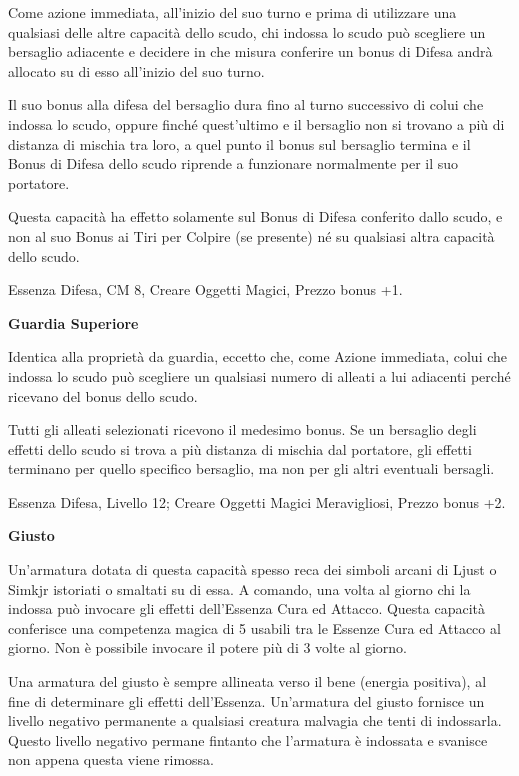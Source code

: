 \documentclass[a4paper,11pt,twoside,openany]{book}
\begin{document}
Come azione immediata, all'inizio del suo turno e prima di utilizzare una qualsiasi delle altre capacità dello scudo, chi indossa lo scudo può scegliere un bersaglio adiacente e decidere in che misura conferire un bonus di Difesa andrà allocato su di esso all'inizio del suo turno.

Il suo bonus alla difesa del bersaglio dura fino al turno successivo di colui che indossa lo scudo, oppure finché quest'ultimo e il bersaglio non si trovano a più di distanza di mischia tra loro, a quel punto il bonus sul bersaglio termina e il Bonus di Difesa dello scudo riprende a funzionare normalmente per il suo portatore.

Questa capacità ha effetto solamente sul Bonus di Difesa conferito dallo scudo, e non al suo Bonus ai Tiri per Colpire (se presente) né su qualsiasi altra capacità dello scudo.

Essenza Difesa, CM 8, Creare Oggetti Magici, Prezzo bonus +1.

\textbf{Guardia Superiore}

Identica alla proprietà da guardia, eccetto che, come Azione immediata, colui che indossa lo scudo può scegliere un qualsiasi numero di alleati a lui adiacenti perché ricevano del bonus dello scudo.

Tutti gli alleati selezionati ricevono il medesimo bonus. Se un bersaglio degli effetti dello scudo si trova a più distanza di mischia dal portatore, gli effetti terminano per quello specifico bersaglio, ma non per gli altri eventuali bersagli.

Essenza Difesa, Livello 12; Creare Oggetti Magici Meravigliosi, Prezzo bonus +2.

\textbf{Giusto}

Un'armatura dotata di questa capacità spesso reca dei simboli arcani di Ljust o Simkjr istoriati o smaltati su di essa. A comando, una volta al giorno chi la indossa può invocare gli effetti dell'Essenza Cura ed Attacco. Questa capacità conferisce una competenza magica di 5 usabili tra le Essenze Cura ed Attacco al giorno. Non è possibile invocare il potere più di 3 volte al giorno.

Una armatura del giusto è sempre allineata verso il bene (energia positiva), al fine di determinare gli effetti dell'Essenza. Un'armatura del giusto fornisce un livello negativo permanente a qualsiasi creatura malvagia che tenti di indossarla. Questo livello negativo permane fintanto che l'armatura è indossata e svanisce non appena questa viene rimossa.
\end{document}
